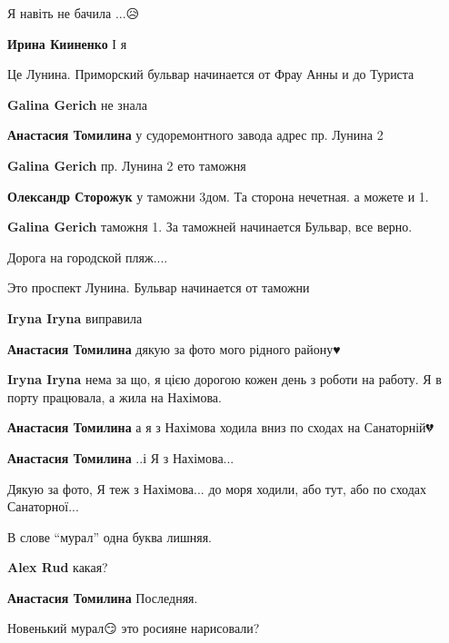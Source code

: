  
 
 
 
 

\qqSecCmt


Я навіть не бачила ...😥

\textbf{Ирина Кииненко} І я


Це Лунина. Приморский бульвар начинается от Фрау Анны и до Туриста

\begin{itemize} %
\textbf{Galina Gerich} не знала

\textbf{Анастасия Томилина} у судоремонтного завода адрес пр. Лунина 2

\textbf{Galina Gerich} пр. Лунина 2 ето таможня

\textbf{Олександр Сторожук} у таможни 3дом. Та сторона нечетная. а можете и 1.

\textbf{Galina Gerich} таможня 1. За таможней начинается Бульвар, все верно.
\end{itemize} %


Дорога на городской пляж....


Это проспект Лунина. Бульвар начинается от таможни

\begin{itemize} %
\textbf{Iryna Iryna} виправила

\begin{itemize} %
\textbf{Анастасия Томилина} дякую за фото мого рідного району♥️

\textbf{Iryna Iryna} нема за що, я цією дорогою кожен день з роботи на работу. Я в порту працювала, а жила на Нахімова.

\textbf{Анастасия Томилина} а я з Нахімова ходила вниз по сходах на Санаторній💔

\textbf{Анастасия Томилина} ..і Я з Нахімова...

\end{itemize} %


Дякую за фото, Я теж з Нахімова... до моря ходили, або тут, або по сходах
Санаторної...

\end{itemize} %


В слове \enquote{мурал} одна буква лишняя.

\textbf{Alex Rud} какая?

\textbf{Анастасия Томилина} Последняя.


Новенький мурал😏 это росияне нарисовали?
